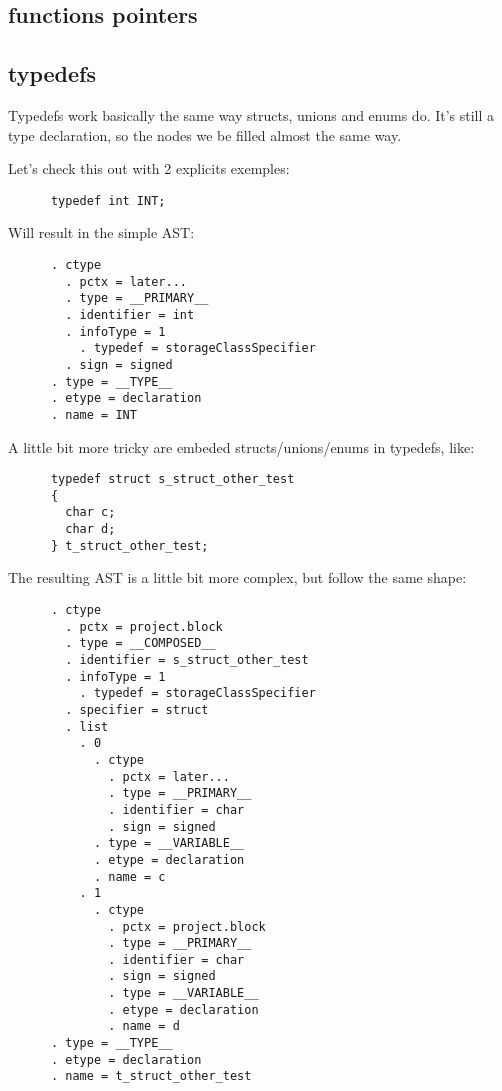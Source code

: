 \documentclass[a4paper,11pt]{report}
\begin{document}
    \subsection{functions pointers}

    \subsection{typedefs}

    Typedefs work basically the same way structs, unions and enums do.
    It's still a type declaration, so the nodes we be filled almost the
    same way.

    Let's check this out with 2 explicits exemples:

    \begin{lstlisting}
      typedef int INT;
    \end{lstlisting}

    Will result in the simple AST:
    \begin{lstlisting}
      . ctype
        . pctx = later...
        . type = __PRIMARY__
        . identifier = int
        . infoType = 1
          . typedef = storageClassSpecifier
        . sign = signed
      . type = __TYPE__
      . etype = declaration
      . name = INT
    \end{lstlisting}

    A little bit more tricky are embeded structs/unions/enums in typedefs,
    like:
    \begin{lstlisting}
      typedef struct s_struct_other_test
      {
        char c;
        char d;
      } t_struct_other_test;
    \end{lstlisting}

    The resulting AST is a little bit more complex, but follow the same shape:
    \begin{lstlisting}
      . ctype
        . pctx = project.block
        . type = __COMPOSED__
        . identifier = s_struct_other_test
        . infoType = 1
          . typedef = storageClassSpecifier
        . specifier = struct
        . list
          . 0
            . ctype
              . pctx = later...
              . type = __PRIMARY__
              . identifier = char
              . sign = signed
            . type = __VARIABLE__
            . etype = declaration
            . name = c
          . 1
            . ctype
              . pctx = project.block
              . type = __PRIMARY__
              . identifier = char
              . sign = signed
              . type = __VARIABLE__
              . etype = declaration
              . name = d
      . type = __TYPE__
      . etype = declaration
      . name = t_struct_other_test
    \end{lstlisting}
\end{document}
